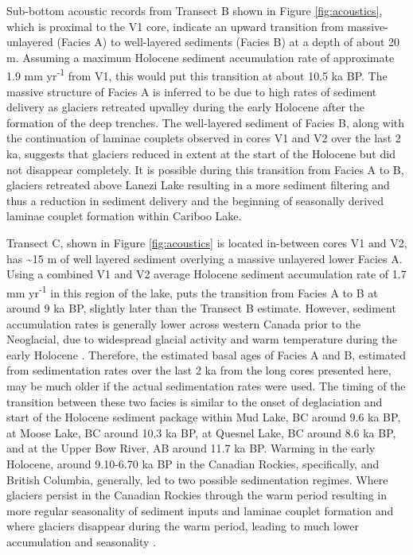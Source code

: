 \documentclass[Royal,times,doublespace,sageh]{sagej}
\begin{document}
Sub-bottom acoustic records from Transect B shown in Figure
\ref{fig:acoustics}, which is proximal to the V1 core, indicate an
upward transition from massive-unlayered (Facies A) to well-layered
sediments (Facies B) at a depth of about 20 m. Assuming a maximum
Holocene sediment accumulation rate of approximate 1.9 mm
yr\textsuperscript{-1} from V1, this would put this transition at about
10.5 ka BP. The massive structure of Facies A is inferred to be due to
high rates of sediment delivery as glaciers retreated upvalley during
the early Holocene after the formation of the deep trenches. The
well-layered sediment of Facies B, along with the continuation of
laminae couplets observed in cores V1 and V2 over the last 2 ka,
suggests that glaciers reduced in extent at the start of the Holocene
but did not disappear completely. It is possible during this transition
from Facies A to B, glaciers retreated above Lanezi Lake resulting in a
more sediment filtering and thus a reduction in sediment delivery and
the beginning of seasonally derived laminae couplet formation within
Cariboo Lake.

Transect C, shown in Figure \ref{fig:acoustics} is located in-between
cores V1 and V2, has \textasciitilde15 m of well layered sediment
overlying a massive unlayered lower Facies A. Using a combined V1 and V2
average Holocene sediment accumulation rate of 1.7 mm
yr\textsuperscript{-1} in this region of the lake, puts the transition
from Facies A to B at around 9 ka BP, slightly later than the Transect B
estimate. However, sediment accumulation rates is generally lower across
western Canada prior to the Neoglacial, due to widespread glacial
activity and warm temperature during the early Holocene
\citep{Steinman2019, Menounos2004, Koch2007a, Osborn2007, Luckman1988, Luckman1993}.
Therefore, the estimated basal ages of Facies A and B, estimated from
sedimentation rates over the last 2 ka from the long cores presented
here, may be much older if the actual sedimentation rates were used. The
timing of the transition between these two facies is similar to the
onset of deglaciation and start of the Holocene sediment package within
Mud Lake, BC \citep{Hodder2006b} around 9.6 ka BP, at Moose Lake, BC
\citep{Desloges1999} around 10.3 ka BP, at Quesnel Lake, BC
\citep{Gilbert2012} around 8.6 ka BP, and at the Upper Bow River, AB
\citep{Leonard1999} around 11.7 ka BP. Warming in the early Holocene,
around 9.10-6.70 ka BP in the Canadian Rockies, specifically,
\citep{Luckman1986} and British Columbia, generally,
\citep{Clague1989, Steinman2019} led to two possible sedimentation
regimes. Where glaciers persist in the Canadian Rockies through the warm
period resulting in more regular seasonality of sediment inputs and
laminae couplet formation \citep[e.g.~Mud Lake,][]{Hodder2006b} and
where glaciers disappear during the warm period, leading to much lower
accumulation and seasonality \citep[e.g.~Moose Lake,][]{Desloges1999}.
\end{document}

